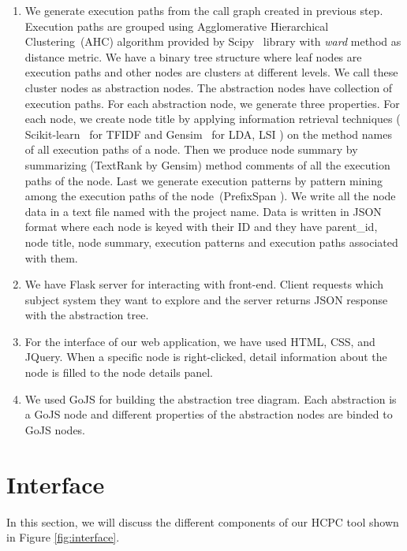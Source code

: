 \begin{enumerate}
    \item We generate execution paths from the call graph created in previous step.
Execution paths are grouped using Agglomerative Hierarchical Clustering~(AHC) algorithm provided by Scipy~\cite{scipy} library with \emph{ward} method as distance metric. We have a binary tree structure where leaf nodes are execution paths and other nodes are clusters at different levels. We call these cluster nodes as abstraction nodes. The abstraction nodes have collection of execution paths. For each abstraction node, we generate three properties. For each node, we create node title by applying information retrieval techniques ( Scikit-learn~\cite{scikit-learn} for TFIDF and Gensim~\cite{gensim} for LDA, LSI ) on the method names of all execution paths of a node. Then we produce node summary by summarizing (TextRank by Gensim) method comments of all the execution paths of the node. Last we generate execution patterns by pattern mining among the execution paths of the node~(PrefixSpan \cite{prefixspan}). We write all the node data in a text file named with the project name. Data is written in JSON format where each node is keyed with their ID and they have parent\_id, node title, node summary, execution patterns and execution paths associated with them. 
    \item We have Flask server for interacting with front-end. Client requests which subject system they want to explore and the server returns JSON response with the abstraction tree. 
    \item For the interface of our web application, we have used HTML, CSS, and JQuery. When a specific node is right-clicked, detail information about the node is filled to the node details panel.
    \item We used GoJS for building the abstraction tree diagram. Each abstraction  is a GoJS node and different properties of the abstraction nodes are binded to GoJS nodes. 

\end{enumerate}


\section{Interface}

In this section, we will discuss the different components of our HCPC tool shown in Figure \ref{fig:interface}.

